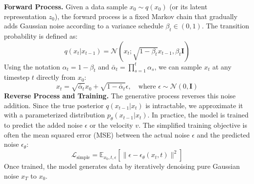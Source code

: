 \documentclass[lettersize,journal]{IEEEtran}
\begin{document}
\noindent \textbf{Forward Process.} Given a data sample $x_0 \sim q(x_0)$ (or its latent representation $z_0$), the forward process is a fixed Markov chain that gradually adds Gaussian noise according to a variance schedule $\beta_t \in (0,1)$. The transition probability is defined as:
\begin{equation}
q(x_t | x_{t-1}) = \mathcal{N}(x_t; \sqrt{1-\beta_t}x_{t-1}, \beta_t \mathbf{I})
\end{equation}
Using the notation $\alpha_t = 1 - \beta_t$ and $\bar{\alpha}_t = \prod_{s=1}^t \alpha_s$, we can sample $x_t$ at any timestep $t$ directly from $x_0$:
\begin{equation}
\label{fwd_ddpm}
x_t = \sqrt{\bar{\alpha}_t}x_0 + \sqrt{1-\bar{\alpha}_t}\epsilon, \quad \text{where } \epsilon \sim \mathcal{N}(0, \mathbf{I})
\end{equation}
\noindent \textbf{Reverse Process and Training.} The generative process reverses this noise addition. Since the true posterior $q(x_{t-1}|x_t)$ is intractable, we approximate it with a parameterized distribution $p_\theta(x_{t-1}|x_t)$. In practice, the model is trained to predict the added noise $\epsilon$ or the velocity $v$. The simplified training objective is often the mean squared error (MSE) between the actual noise $\epsilon$ and the predicted noise $\epsilon_\theta$:
\begin{equation}
\mathcal{L}_{\text{simple}} = \mathbb{E}_{x_0, t, \epsilon} \left[ \| \epsilon - \epsilon_\theta(x_t, t) \|^2 \right]
\end{equation}
Once trained, the model generates data by iteratively denoising pure Gaussian noise $x_T$ to $x_0$.
\end{document}
